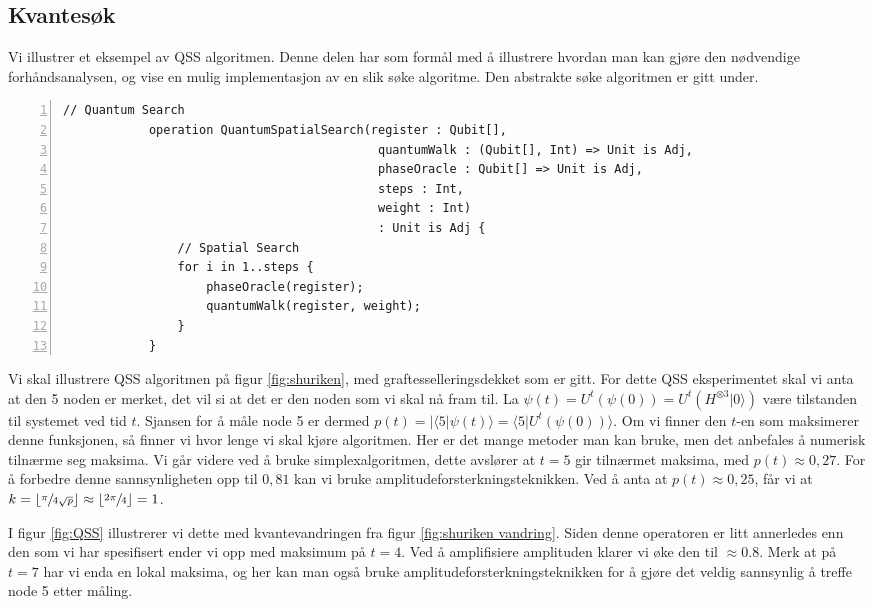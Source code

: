     \subsection{Kvantesøk}

        Vi illustrer et eksempel av QSS algoritmen. Denne delen har som formål med å illustrere hvordan man kan gjøre den nødvendige forhåndsanalysen, og vise en mulig implementasjon av en slik søke algoritme. Den abstrakte søke algoritmen er gitt under.

        \begin{Verbatim}[gobble=2, numbers=left, frame=lines,
            framesep=3mm,
            label={[Beginning of code]End of code}]
            // Quantum Search
            operation QuantumSpatialSearch(register : Qubit[],  
                                            quantumWalk : (Qubit[], Int) => Unit is Adj, 
                                            phaseOracle : Qubit[] => Unit is Adj, 
                                            steps : Int, 
                                            weight : Int) 
                                            : Unit is Adj {
                // Spatial Search
                for i in 1..steps {
                    phaseOracle(register);
                    quantumWalk(register, weight);
                }
            }
        \end{Verbatim}

        Vi skal illustrere QSS algoritmen på figur \ref{fig:shuriken}, med graftesselleringsdekket som er gitt. For dette QSS eksperimentet skal vi anta at den 5 noden er merket, det vil si at det er den noden som vi skal nå fram til. La $\psi(t) = U^t(\psi(0)) = U^t(H^{\otimes 3}|0\rangle)$ være tilstanden til systemet ved tid $t$. Sjansen for å måle node 5 er dermed $p(t) = |\langle 5|\psi(t)\rangle = \langle 5|U^t(\psi(0))\rangle$. Om vi finner den $t$-en som maksimerer denne funksjonen, så finner vi hvor lenge vi skal kjøre algoritmen. Her er det mange metoder man kan bruke, men det anbefales å numerisk tilnærme seg maksima. Vi går videre ved å bruke simplexalgoritmen, dette avslører at $t=5$ gir tilnærmet maksima, med $p(t) \approx 0,27$. For å forbedre denne sannsynligheten opp til $0,81$ kan vi bruke amplitudeforsterkningsteknikken. Ved å anta at $p(t) \approx 0,25$, får vi at $k = \lfloor \sfrac{\pi}{4\sqrt{p}}\rfloor \approx \lfloor\sfrac{2\pi}{4}\rfloor = 1$.

        I figur \ref{fig:QSS} illustrerer vi dette med kvantevandringen fra figur \ref{fig:shuriken vandring}. Siden denne operatoren er litt annerledes enn den som vi har spesifisert ender vi opp med maksimum på $t=4$. Ved å amplifisiere amplituden klarer vi øke den til $\approx 0.8$. Merk at på $t=7$ har vi enda en lokal maksima, og her kan man også bruke amplitudeforsterkningsteknikken for å gjøre det veldig sannsynlig å treffe node 5 etter måling.
        

